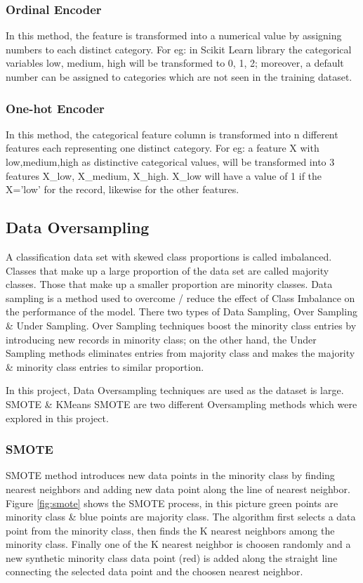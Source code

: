 \documentclass[twoside,11pt,a4paper]{article}
\begin{document}
\subsubsection{Ordinal Encoder}
In this method, the feature is transformed into a numerical value by assigning numbers to each distinct category. For eg: in Scikit Learn library the categorical variables low, medium, high will be transformed to 0, 1, 2; moreover, a default number can be assigned to categories which are not seen in the training dataset. 
\subsubsection{One-hot Encoder}
In this method, the categorical feature column is transformed into n different features each representing one distinct category. For eg: a feature X with low,medium,high as distinctive categorical values, will be transformed into 3 features X\_low, X\_medium, X\_high. X\_low will have a value of 1 if the X='low' for the record, likewise for the other features.
\subsection{Data Oversampling}
A classification data set with skewed class proportions is called imbalanced. Classes that make up a large proportion of the data set are called majority classes. Those that make up a smaller proportion are minority classes. Data sampling is a method used to overcome / reduce the effect of Class Imbalance on the performance of the model. There two types of Data Sampling, Over Sampling \& Under Sampling. Over Sampling techniques boost the minority class entries by introducing new records in minority class; on the other hand, the Under Sampling methods eliminates entries from majority class and makes the majority \& minority class entries to similar proportion.

In this project, Data Oversampling techniques are used as the dataset is large. \acf{SMOTE} \citep{chawla2002smote} \&  KMeans \acs{SMOTE} \citep{last2017oversampling} are two different Oversampling methods which were explored in this project.

\subsubsection{\acf{SMOTE}}
\acs{SMOTE} method introduces new data points in the minority class by finding nearest neighbors and adding new data point along the line of nearest neighbor. Figure \ref{fig:smote} shows the \acs{SMOTE} process, in this picture green points are minority class \&  blue points are majority class. The algorithm first selects a data point from the minority class, then finds the K nearest neighbors among the minority class. Finally one of the K nearest neighbor is choosen randomly and a new synthetic minority class data point (red) is added along the straight line connecting the selected data point and the choosen nearest neighbor.
\end{document}
